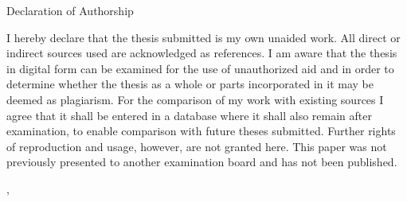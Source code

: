 \cleardoublepage{}

\thispagestyle{empty}
\begin{center}{\Huge Declaration of Authorship}
\end{center}

\vspace*{0.1\textheight}
\noindent
\makeatletter
I hereby declare that the thesis submitted is my own unaided work. All direct or indirect sources used are acknowledged as references. I am aware that the thesis in digital form can be examined for the use of unauthorized
aid and in order to determine whether the thesis as a whole or parts incorporated
in it may be deemed as plagiarism. For the comparison of my work with existing
sources I agree that it shall be entered in a database where it shall also remain
after examination, to enable comparison with future theses submitted. Further rights
of reproduction and usage, however, are not granted here. This paper was not previously presented to another examination board and has not
been published.
\makeatother

\vspace{15mm}
\noindent 
\getSubLoc,
\getSubDate
\hspace{50mm}
\getAuthor
 \hspace{50mm} 

\cleardoublepage{}